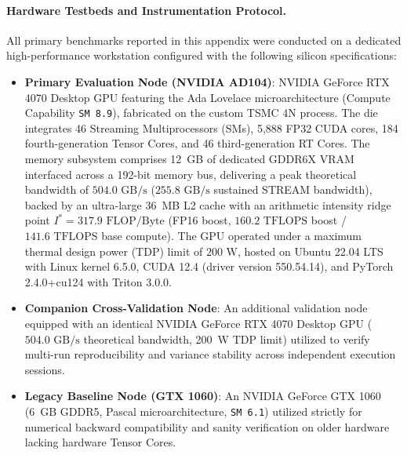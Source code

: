 \paragraph{Hardware Testbeds and Instrumentation Protocol.}
All primary benchmarks reported in this appendix were conducted on a dedicated high-performance workstation configured with the following silicon specifications:
\begin{itemize}
    \item \textbf{Primary Evaluation Node (NVIDIA AD104)}: NVIDIA GeForce RTX 4070 Desktop GPU featuring the Ada Lovelace microarchitecture (Compute Capability \texttt{SM 8.9}), fabricated on the custom TSMC 4N process. The die integrates 46 Streaming Multiprocessors (SMs), 5,888 FP32 CUDA cores, 184 fourth-generation Tensor Cores, and 46 third-generation RT Cores. The memory subsystem comprises 12~GB of dedicated GDDR6X VRAM interfaced across a 192-bit memory bus, delivering a peak theoretical bandwidth of $504.0\text{ GB/s}$ ($255.8\text{ GB/s}$ sustained STREAM bandwidth), backed by an ultra-large 36~MB L2 cache with an arithmetic intensity ridge point $I^* = 317.9\text{ FLOP/Byte}$ (FP16 boost, $160.2\text{ TFLOPS}$ boost / $141.6\text{ TFLOPS}$ base compute). The GPU operated under a maximum thermal design power (TDP) limit of $200\text{ W}$, hosted on Ubuntu 22.04 LTS with Linux kernel 6.5.0, CUDA 12.4 (driver version 550.54.14), and PyTorch 2.4.0+cu124 with Triton 3.0.0.
    \item \textbf{Companion Cross-Validation Node}: An additional validation node equipped with an identical NVIDIA GeForce RTX 4070 Desktop GPU ($504.0\text{ GB/s}$ theoretical bandwidth, 200~W TDP limit) utilized to verify multi-run reproducibility and variance stability across independent execution sessions.
    \item \textbf{Legacy Baseline Node (GTX 1060)}: An NVIDIA GeForce GTX 1060 (6~GB GDDR5, Pascal microarchitecture, \texttt{SM 6.1}) utilized strictly for numerical backward compatibility and sanity verification on older hardware lacking hardware Tensor Cores.
\end{itemize}

